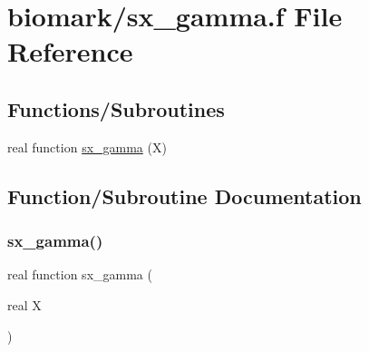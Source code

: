 \hypertarget{sx__gamma_8f}{}\section{biomark/sx\+\_\+gamma.f File Reference}
\label{sx__gamma_8f}
\subsection*{Functions/\+Subroutines}
\begin{DoxyCompactItemize}
\item 
real function \hyperlink{sx__gamma_8f_ac7259b49d8cefce77523840b5474d84a}{sx\+\_\+gamma} (X)
\end{DoxyCompactItemize}


\subsection{Function/\+Subroutine Documentation}
\mbox{\label{sx__gamma_8f_ac7259b49d8cefce77523840b5474d84a}} 
\subsubsection{\texorpdfstring{sx\+\_\+gamma()}{sx\_gamma()}}
{\footnotesize\ttfamily real function sx\+\_\+gamma (\begin{DoxyParamCaption}\item[{real}]{X }\end{DoxyParamCaption})}

